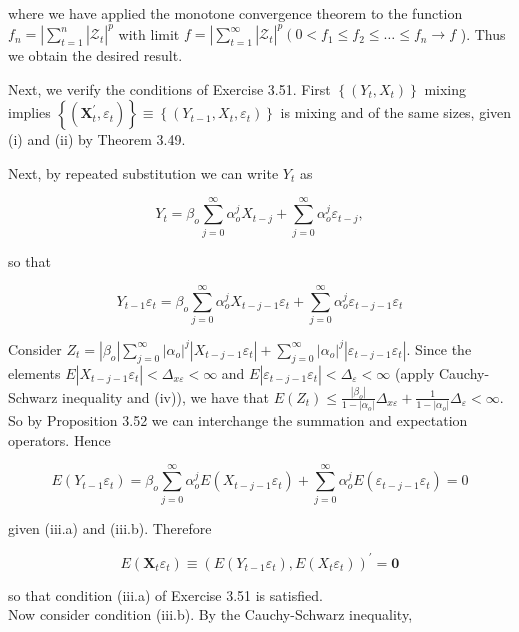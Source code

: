 \documentclass[10pt]{article}
\begin{document}
where we have applied the monotone convergence theorem to the function $f_{n}=\left.\left|\sum_{t=1}^{n}\right| \mathcal{Z}_{t}\right|^{p}$ with limit $f=\left.\left|\sum_{t=1}^{\infty}\right| \mathcal{Z}_{t}\right|^{p}\left(0<f_{1} \leq f_{2} \leq \ldots \leq f_{n} \rightarrow\right. f$ ). Thus we obtain the desired result.

Next, we verify the conditions of Exercise 3.51. First $\left\{\left(Y_{t}, X_{t}\right)\right\}$ mixing implies $\left\{\left(\mathbf{X}_{t}^{\prime}, \varepsilon_{t}\right)\right\} \equiv\left\{\left(Y_{t-1}, X_{t}, \varepsilon_{t}\right)\right\}$ is mixing and of the same sizes, given (i) and (ii) by Theorem 3.49.

Next, by repeated substitution we can write $Y_{t}$ as

$$
Y_{t}=\beta_{o} \sum_{j=0}^{\infty} \alpha_{o}^{j} X_{t-j}+\sum_{j=0}^{\infty} \alpha_{o}^{j} \varepsilon_{t-j},
$$

so that

$$
Y_{t-1} \varepsilon_{t}=\beta_{o} \sum_{j=0}^{\infty} \alpha_{o}^{j} X_{t-j-1} \varepsilon_{t}+\sum_{j=0}^{\infty} \alpha_{o}^{j} \varepsilon_{t-j-1} \varepsilon_{t}
$$

Consider $Z_{t}=\left|\beta_{o}\right| \sum_{j=0}^{\infty}\left|\alpha_{o}\right|^{j}\left|X_{t-j-1} \varepsilon_{t}\right|+\sum_{j=0}^{\infty}\left|\alpha_{o}\right|^{j}\left|\varepsilon_{t-j-1} \varepsilon_{t}\right|$. Since the elements $E\left|X_{t-j-1} \varepsilon_{t}\right|<\Delta_{x \varepsilon}<\infty$ and $E\left|\varepsilon_{t-j-1} \varepsilon_{t}\right|<\Delta_{\varepsilon}<\infty$ (apply Cauchy-Schwarz inequality and (iv)), we have that $E\left(Z_{t}\right) \leq \frac{\left|\beta_{o}\right|}{1-\left|\alpha_{o}\right|} \Delta_{x \varepsilon}+ \frac{1}{1-\left|\alpha_{o}\right|} \Delta_{\varepsilon}<\infty$. So by Proposition 3.52 we can interchange the summation and expectation operators. Hence

$$
E\left(Y_{t-1} \varepsilon_{t}\right)=\beta_{o} \sum_{j=0}^{\infty} \alpha_{o}^{j} E\left(X_{t-j-1} \varepsilon_{t}\right)+\sum_{j=0}^{\infty} \alpha_{o}^{j} E\left(\varepsilon_{t-j-1} \varepsilon_{t}\right)=0
$$

given (iii.a) and (iii.b). Therefore

$$
E\left(\mathbf{X}_{t} \varepsilon_{t}\right) \equiv\left(E\left(Y_{t-1} \varepsilon_{t}\right), E\left(X_{t} \varepsilon_{t}\right)\right)^{\prime}=\mathbf{0}
$$

so that condition (iii.a) of Exercise 3.51 is satisfied.\\
Now consider condition (iii.b). By the Cauchy-Schwarz inequality,
\end{document}
